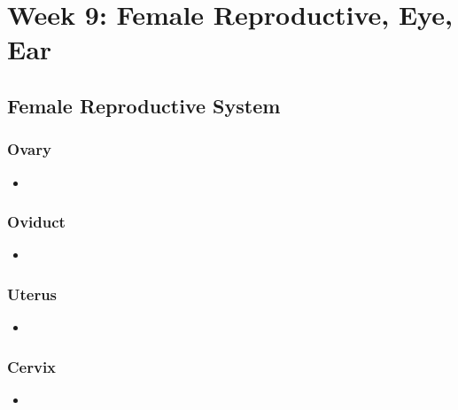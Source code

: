 \chapter{Week 9: Female Reproductive, Eye, Ear}

\section{Female Reproductive System}

\subsection{Ovary}
\begin{center}
\end{center}
\begin{multicols}{2}
\begin{itemize}
  \item 
\end{itemize}
\end{multicols}

\subsection{Oviduct}
\begin{center}
\end{center}
\begin{multicols}{2}
\begin{itemize}
  \item 
\end{itemize}
\end{multicols}

\subsection{Uterus}
\begin{center}
\end{center}
\begin{multicols}{2}
\begin{itemize}
  \item 
\end{itemize}
\end{multicols}

\subsection{Cervix}
\begin{center}
\end{center}
\begin{multicols}{2}
\begin{itemize}
  \item 
\end{itemize}
\end{multicols}




